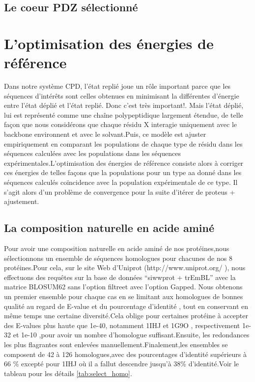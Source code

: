 \subsection{Le coeur PDZ sélectionné}


\section{L'optimisation des énergies de référence} 
\label{sec:optERef}

Dans notre système CPD, l'état replié joue un rôle important parce que les séquences d’intérêts sont celles obtenues en minimisant la différentes d’énergie entre l'état déplié et l'état replié. Donc c'est très important!.
Mais l'état déplié, lui est représenté comme une chaîne polypeptidique largement étendue, de telle façon que nous considérons que chaque résidu X interagie uniquement avec le backbone environnent et avec le solvant.Puis, ce modèle est ajuster empiriquement en comparant les populations de chaque type de résidu dans les séquences calculées avec les populations dans les séquences expérimentales.L'optimisation des énergies de référence consiste alors à corriger ces énergies de telles façons que la populations pour un type aa donné dans les séquences calculés coïncidence avec la population expérimentale de ce type. Il s'agit alors d'un problème de convergence pour la suite d'itérer de proteus + ajustement.

\subsection{La composition naturelle en acide aminé}

Pour avoir une composition naturelle en acide aminé de nos protéines,nous sélectionnons un ensemble de séquences homologues pour chacunes de nos 8 protéines.Pour cela, sur le site Web d'Uniprot (http://www.uniprot.org/ ), nous effectuons des requêtes sur la base de données ``siwwprot + trEmBL'' avec la matrice BLOSUM62 sans l'option \og filtre\fg et avec l'option \og Gapped\fg. Nous obtenons un premier ensemble pour chaque cas en se limitant aux homologues de bonnes qualité au regard de E-value et du pourcentage d'identité , tout en conservant  en même temps une certaine diversité.Cela oblige pour certaines protéine à accepter des E-values plus haute que  1e-40, notamment 1IHJ et 1G9O , respectivement 1e-32 et 1e-10 ,pour avoir un nombre d'homologue suffisant.Ensuite, les redondances les plus flagrantes sont enlevées manuellement.Finalement,les ensembles se composent de 42 à 126 homologues,avec des pourcentages d'identité supérieurs à 66 \% excepté pour 1IHJ où il a fallut descendre jusqu'à 38\% d'identité.Voir le tableau pour les détails \ref{tab:select_homo}.


